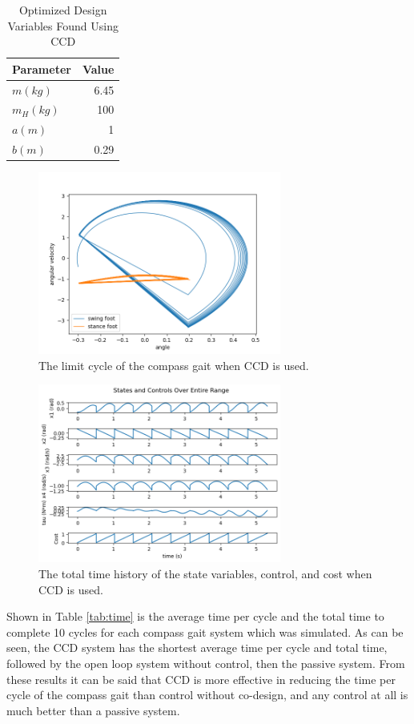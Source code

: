 \documentclass{./springer/svjour3}
\begin{document}
\begin{table}[h]
\centering
\caption{Optimized Design Variables Found Using CCD}
\begin{tabular}{lr}
\toprule
Parameter & Value \\
\midrule
$m (kg)$ & 6.45 \\
$m_H (kg)$ & 100 \\
$a (m)$ & 1 \\
$b (m)$ & 0.29 \\
\end{tabular}
\label{tab:opt_vars}
\end{table}
  


\begin{figure}[h]
\centering
\includegraphics[width=8cm]{./figures/limcyc_CCD.png}
\caption{The limit cycle of the compass gait when CCD is used.}
\label{fig:limcyc_CCD}
\end{figure}

\begin{figure}[h]
\centering
\includegraphics[width=8cm]{./figures/timehis_CCD.png}
\caption{The total time history of the state variables, control, and cost when CCD is used.}
\label{fig:timehis_CCD}
\end{figure}  


Shown in Table \ref{tab:time} is the average time per cycle and the total time to complete 10 cycles for each compass gait system which was simulated. As can be seen, the CCD system 
has the shortest average time per cycle and total time, followed by the open loop system without control, then the passive system. From these results it can be said that 
CCD is more effective in reducing the time per cycle of the compass gait than control without co-design, and any control at all is much better than a passive system.
\end{document}
